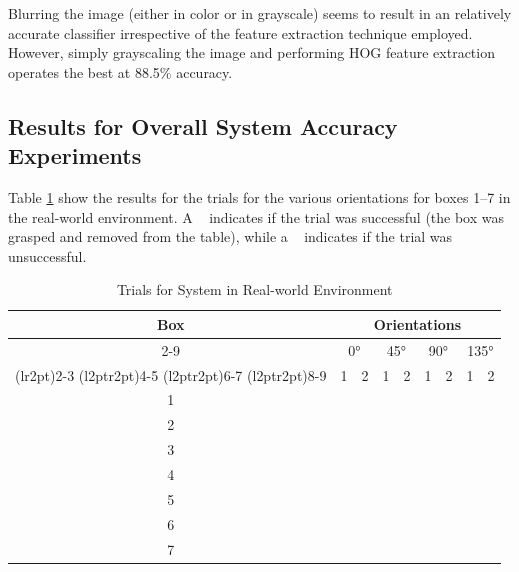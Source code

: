 \documentclass[letterpaper, 10 pt, conference]{conf/ieeeconf}  %
\newcommand{\cmark}{\ding{51}}%
\newcommand{\xmark}{\ding{55}}%
\begin{document}
Blurring the image (either in color or in grayscale) seems to result in an
relatively accurate classifier irrespective of the feature extraction technique
employed.\\

However, simply grayscaling the image and performing HOG feature
extraction operates the best at 88.5\% accuracy.

\subsection{Results for Overall System Accuracy Experiments}
Table \ref{tab:trials_real_world} show the results for the trials for the
various orientations for boxes 1--7 in the real-world environment. A \cmark~
indicates if the trial was successful (the box was grasped and removed from the
table), while a \xmark~ indicates if the trial was unsuccessful.
\begin{table}[H]
  \centering
  \begin{tabular}{c c c c c c c c c}
    \toprule
    \multirow{4}{*}[-0.5\dimexpr \aboverulesep + \belowrulesep + \cmidrulewidth]{Box} & \multicolumn{8}{c}{Orientations}\\
    \cmidrule(rl){2-9}
        & \multicolumn{2}{c}{\ang{0}} & \multicolumn{2}{c}{\ang{45}} & \multicolumn{2}{c}{\ang{90}} & \multicolumn{2}{c}{\ang{135}} \\
    \cmidrule(lr{2pt}){2-3}
    \cmidrule(l{2pt}r{2pt}){4-5}
    \cmidrule(l{2pt}r{2pt}){6-7}
    \cmidrule(l{2pt}r{2pt}){8-9}
        & 1      & 2      & 1      & 2      &  1     & 2      &  1     &  2     \\
    \midrule
    1 & \cmark & \cmark & \cmark & \cmark & \cmark & \cmark & \cmark & \cmark \\
    2 & \cmark & \cmark & \cmark & \cmark & \cmark & \cmark & \cmark & \cmark \\
    3 & \cmark & \cmark & \cmark & \cmark & \cmark & \cmark & \cmark & \cmark \\
    4 & \cmark & \cmark & \cmark & \cmark & \cmark & \cmark & \cmark & \cmark \\
    5 & \cmark & \cmark & \cmark & \cmark & \cmark & \cmark & \cmark & \cmark \\
    6 & \cmark & \cmark & \cmark & \cmark & \cmark & \cmark & \cmark & \cmark \\
    7 & \cmark & \cmark & \cmark & \cmark & \cmark & \cmark & \cmark & \cmark \\
    \bottomrule
  \end{tabular}
  \caption{Trials for System in Real-world Environment}
  \label{tab:trials_real_world}
\end{table}
\end{document}
